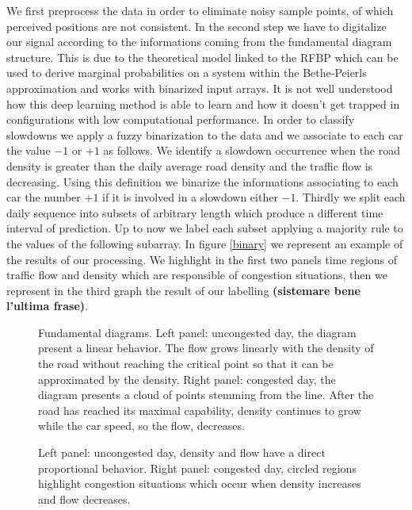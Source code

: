 \documentclass[a4paper,12pt]{article}
\begin{document}
We first preprocess the data in order to eliminate noisy sample points, of which perceived positions are not consistent. In the second step we have to digitalize our signal according to the informations coming from the fundamental diagram structure. This is due to the theoretical model linked to the RFBP \cite{BB16, BB15} which can be used to derive marginal probabilities on a system within the Bethe-Peierls approximation and works with binarized input arrays. It is not well understood how this deep learning method is able to learn and how it doesn't get trapped in configurations with low computational performance. In order to classify slowdowns we apply a fuzzy binarization to the data and we associate to each car the value $-1$ or $+1$ as follows. We identify a slowdown occurrence when the road density is greater than the daily average road density and the traffic flow is decreasing. 
Using this definition we binarize the informations associating to each car the number $+ 1$ if it is involved in a slowdown either $-1$.
Thirdly we split each daily sequence into subsets of arbitrary length which produce a different time interval of prediction. Up to now we label each subset applying a majority rule to the values of the following subarray. In figure \ref{binary} we represent an example of the results of our processing. We highlight in the first two panels time regions of traffic flow and density which are responsible of congestion situations, then we represent in the third graph the result of our labelling \textbf{(sistemare bene l'ultima frase)}. 


\begin{figure}
\centering
{}
\hspace{1mm}
\caption{Fundamental diagrams. Left panel: uncongested day, the diagram present a linear behavior. The flow grows linearly with the density of the road without reaching the critical point so that it can be approximated by the density. Right panel: congested day, the diagram presents a cloud of points stemming from the line. After the road has reached its maximal capability, density continues to grow while the car speed, so the flow, decreases. }\label{diagram}
\end{figure}

\begin{figure}
\centering
{}
\hspace{1mm}
\caption{Left panel: uncongested day, density and flow have a direct proportional behavior. Right panel: congested day, circled regions highlight congestion situations which occur when density increases and flow decreases.}\label{densityflow}
\end{figure}
\end{document}
